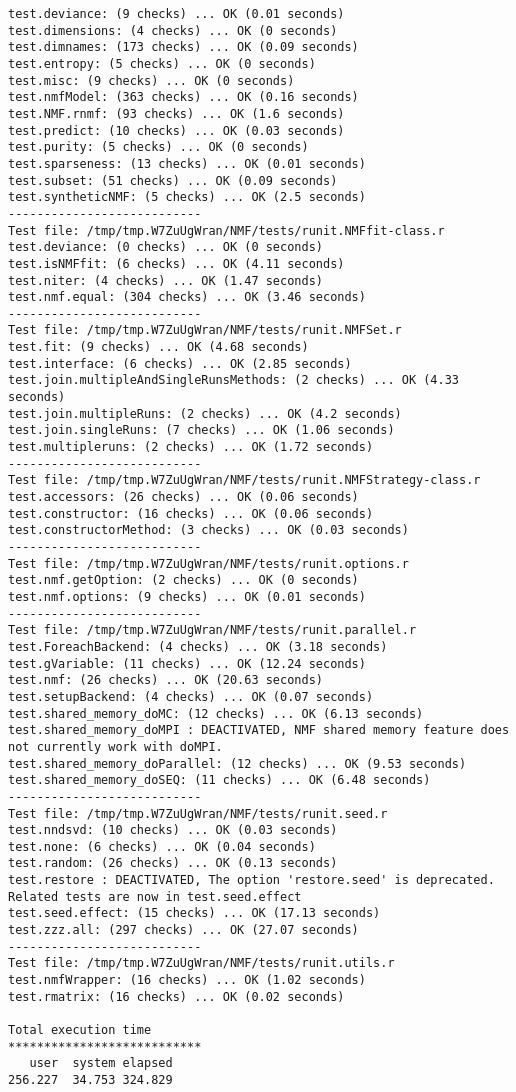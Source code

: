 \documentclass[10pt]{article}
\begin{document}
\begin{verbatim}
test.deviance: (9 checks) ... OK (0.01 seconds)
test.dimensions: (4 checks) ... OK (0 seconds)
test.dimnames: (173 checks) ... OK (0.09 seconds)
test.entropy: (5 checks) ... OK (0 seconds)
test.misc: (9 checks) ... OK (0 seconds)
test.nmfModel: (363 checks) ... OK (0.16 seconds)
test.NMF.rnmf: (93 checks) ... OK (1.6 seconds)
test.predict: (10 checks) ... OK (0.03 seconds)
test.purity: (5 checks) ... OK (0 seconds)
test.sparseness: (13 checks) ... OK (0.01 seconds)
test.subset: (51 checks) ... OK (0.09 seconds)
test.syntheticNMF: (5 checks) ... OK (2.5 seconds)
--------------------------- 
Test file: /tmp/tmp.W7ZuUgWran/NMF/tests/runit.NMFfit-class.r 
test.deviance: (0 checks) ... OK (0 seconds)
test.isNMFfit: (6 checks) ... OK (4.11 seconds)
test.niter: (4 checks) ... OK (1.47 seconds)
test.nmf.equal: (304 checks) ... OK (3.46 seconds)
--------------------------- 
Test file: /tmp/tmp.W7ZuUgWran/NMF/tests/runit.NMFSet.r 
test.fit: (9 checks) ... OK (4.68 seconds)
test.interface: (6 checks) ... OK (2.85 seconds)
test.join.multipleAndSingleRunsMethods: (2 checks) ... OK (4.33 seconds)
test.join.multipleRuns: (2 checks) ... OK (4.2 seconds)
test.join.singleRuns: (7 checks) ... OK (1.06 seconds)
test.multipleruns: (2 checks) ... OK (1.72 seconds)
--------------------------- 
Test file: /tmp/tmp.W7ZuUgWran/NMF/tests/runit.NMFStrategy-class.r 
test.accessors: (26 checks) ... OK (0.06 seconds)
test.constructor: (16 checks) ... OK (0.06 seconds)
test.constructorMethod: (3 checks) ... OK (0.03 seconds)
--------------------------- 
Test file: /tmp/tmp.W7ZuUgWran/NMF/tests/runit.options.r 
test.nmf.getOption: (2 checks) ... OK (0 seconds)
test.nmf.options: (9 checks) ... OK (0.01 seconds)
--------------------------- 
Test file: /tmp/tmp.W7ZuUgWran/NMF/tests/runit.parallel.r 
test.ForeachBackend: (4 checks) ... OK (3.18 seconds)
test.gVariable: (11 checks) ... OK (12.24 seconds)
test.nmf: (26 checks) ... OK (20.63 seconds)
test.setupBackend: (4 checks) ... OK (0.07 seconds)
test.shared_memory_doMC: (12 checks) ... OK (6.13 seconds)
test.shared_memory_doMPI : DEACTIVATED, NMF shared memory feature does not currently work with doMPI.
test.shared_memory_doParallel: (12 checks) ... OK (9.53 seconds)
test.shared_memory_doSEQ: (11 checks) ... OK (6.48 seconds)
--------------------------- 
Test file: /tmp/tmp.W7ZuUgWran/NMF/tests/runit.seed.r 
test.nndsvd: (10 checks) ... OK (0.03 seconds)
test.none: (6 checks) ... OK (0.04 seconds)
test.random: (26 checks) ... OK (0.13 seconds)
test.restore : DEACTIVATED, The option 'restore.seed' is deprecated. Related tests are now in test.seed.effect
test.seed.effect: (15 checks) ... OK (17.13 seconds)
test.zzz.all: (297 checks) ... OK (27.07 seconds)
--------------------------- 
Test file: /tmp/tmp.W7ZuUgWran/NMF/tests/runit.utils.r 
test.nmfWrapper: (16 checks) ... OK (1.02 seconds)
test.rmatrix: (16 checks) ... OK (0.02 seconds)

Total execution time
***************************
   user  system elapsed 
256.227  34.753 324.829 

\end{verbatim}
\end{document}
